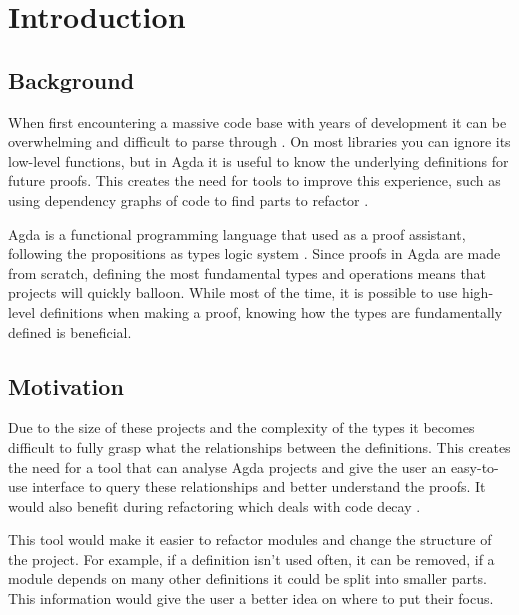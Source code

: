 
\chapter{Introduction}


\section{Background}

When first encountering a massive code base with years of development it can be
overwhelming and difficult to parse through \cite{code_decay}. On most
libraries you can ignore its low-level functions, but in Agda it is useful to
know the underlying definitions for future proofs. This creates the need for
tools to improve this experience, such as using dependency graphs of code to
find parts to refactor \cite{dep_grah_refactoring}.

Agda is a functional programming language that used as a proof assistant,
following the propositions as types logic system \cite{agda_docs}. Since proofs
in Agda are made from scratch, defining the most fundamental types and
operations means that projects will quickly balloon. While most of the time, it
is possible to use high-level definitions when making a proof, knowing how
the types are fundamentally defined is beneficial. 

\section{Motivation}

Due to the size of these projects and the complexity of the types it becomes
difficult to fully grasp what the relationships between the definitions. This
creates the need for a tool that can analyse Agda projects and give the user an
easy-to-use interface to query these relationships and better understand the
proofs. It would also benefit during refactoring which deals with code decay
\cite{fowler2018refactoring}.

This tool would make it easier to refactor modules and change the structure of the
project. For example, if a definition isn't used often, it
can be removed, if a module depends on many other definitions it could be
split into smaller parts. This information would give the user a better
idea on where to put their focus.

